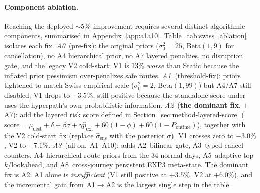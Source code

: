 \documentclass[11pt]{article}
\theoremstyle{definition}
\theoremstyle{remark}
\begin{document}
\paragraph{Component ablation.} Reaching the deployed
$\sim\!5\%$ improvement requires several distinct algorithmic
components, summarised in Appendix~\ref{app:a1a10}.
Table~\ref{tab:swiss_ablation} isolates each fix.
\emph{A0}~(pre-fix): the original priors ($\sigma^2_0{=}25$,
Beta$(1,9)$ for cancellation), no A4 hierarchical prior, no A7
layered penalties, no disruption gate, and the legacy V2
cold-start; V1 is $13\%$ \emph{worse} than Static because the
inflated prior pessimism over-penalizes safe routes.
\emph{A1}~(threshold-fix): priors tightened to match Swiss
empirical scale ($\sigma_0^2{=}2$, Beta$(1,99)$) but A4/A7 still
disabled; V1 drops to $+3.5\%$, still positive because the
standalone score under-uses the hyperpath's own probabilistic
information. \emph{A2}~(\textbf{the dominant fix}, $+\,$A7): add
the layered risk score defined in Section~\ref{sec:method-layered-score}
($\mathrm{score} = \mu_{\text{dest}} + \delta + \beta\sigma + \gamma
\hat p_{\text{cxl}} + 60(1{-}\phi) + 60(1{-}P_{\text{ontime}})$),
together with the V2 cold-start fix (replace
$\hat\sigma_{\mathrm{ens}}$ with the posterior $\sigma$). V1
crosses zero to $-3.0\%$, V2 to $-7.1\%$. \emph{A3}~(all-on,
A1--A10): adds A2~bilinear gate, A3~typed cancel counters,
A4~hierarchical route priors from the $34$ normal days, A5~adaptive
top-$k$/lookahead, and A8~cross-journey persistent EXP3 meta-state.
The dominant fix is A2: A1 alone is \emph{insufficient} (V1 still
positive at $+3.5\%$, V2 at $+6.0\%$), and the incremental gain
from A1$\to$A2 is the largest single step in the table.
\end{document}
